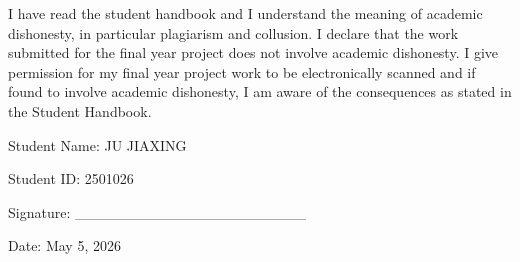 I have read the student handbook and I understand the meaning of academic dishonesty, in particular plagiarism and collusion. I declare that the work submitted for the final year project does not involve academic dishonesty. I give permission for my final year project work to be electronically scanned and if found to involve academic dishonesty, I am aware of the consequences as stated in the Student Handbook.

Student Name: JU JIAXING

Student ID: 2501026

Signature: \_\_\_\_\_\_\_\_\_\_\_\_\_\_\_\_\_\_\_\_\_\_

Date: May 5, 2026
